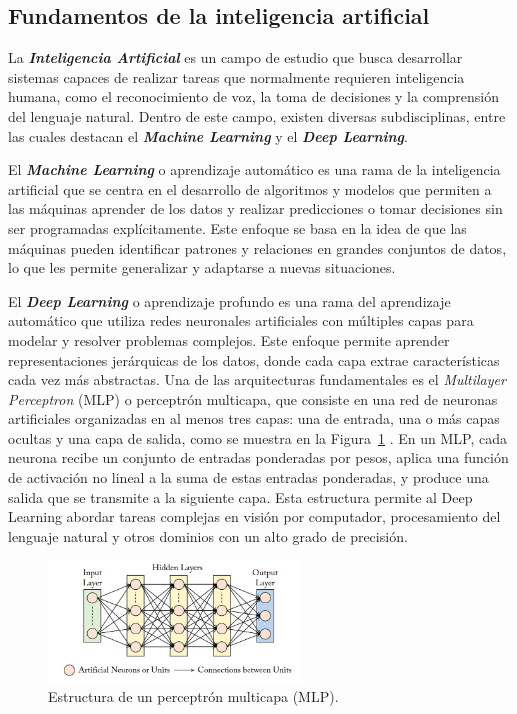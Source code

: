 \documentclass[11pt,spanish,listoffigures,listoftables]{tfgetsinf}
\begin{document}
\subsection{Fundamentos de la inteligencia artificial}
La \textit{\textbf{Inteligencia Artificial}} es un campo de estudio que busca desarrollar sistemas capaces de realizar tareas que normalmente requieren inteligencia humana, como el reconocimiento de voz, la toma de decisiones y la comprensión del lenguaje natural. Dentro de este campo, existen diversas subdisciplinas, entre las cuales destacan el \textit{\textbf{Machine Learning}} y el \textit{\textbf{Deep Learning}}.

El \textit{\textbf{Machine Learning}} o aprendizaje automático es una rama de la inteligencia artificial que se centra en el desarrollo de algoritmos y modelos que permiten a las máquinas aprender de los datos y realizar predicciones o tomar decisiones sin ser programadas explícitamente. Este enfoque se basa en la idea de que las máquinas pueden identificar patrones y relaciones en grandes conjuntos de datos, lo que les permite generalizar y adaptarse a nuevas situaciones.

El \textit{\textbf{Deep Learning}} o aprendizaje profundo es una rama del aprendizaje automático que utiliza redes neuronales artificiales con múltiples capas para modelar y resolver problemas complejos. Este enfoque permite aprender representaciones jerárquicas de los datos, donde cada capa extrae características cada vez más abstractas. Una de las arquitecturas fundamentales es el \textit{Multilayer Perceptron} (MLP) o perceptrón multicapa, que consiste en una red de neuronas artificiales organizadas en al menos tres capas: una de entrada, una o más capas ocultas y una capa de salida, como se muestra en la Figura~\ref{fig:multilayer_perceptron} \cite{khan2018guide}. En un MLP, cada neurona recibe un conjunto de entradas ponderadas por pesos, aplica una función de activación no lineal a la suma de estas entradas ponderadas, y produce una salida que se transmite a la siguiente capa. Esta estructura permite al Deep Learning abordar tareas complejas en visión por computador, procesamiento del lenguaje natural y otros dominios con un alto grado de precisión.


\begin{figure}[H]
   \centering
   \includegraphics[width=0.6\textwidth]{images/estado_del_arte/multilayer_perceptron.png}
   \caption{Estructura de un perceptrón multicapa (MLP).}
   \label{fig:multilayer_perceptron}
\end{figure}
\end{document}
